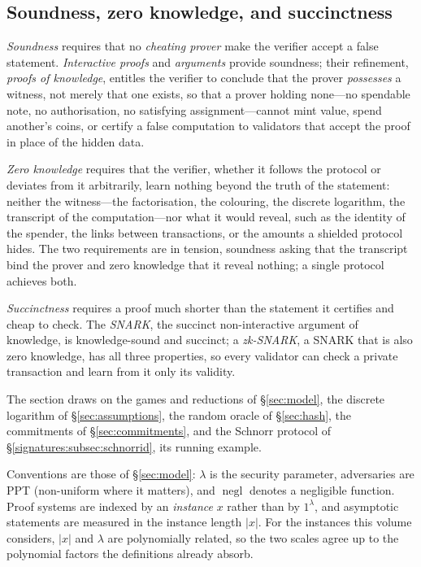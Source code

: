 \documentclass[11pt,a4paper]{article}
\theoremstyle{definition}
\theoremstyle{remark}
\DeclareMathOperator{\negl}{negl}
\providecommand{\abs}[1]{\lvert #1 \rvert}
\begin{document}
\subsection{Soundness, zero knowledge, and succinctness}\label{zk:subsec:questions}

\emph{Soundness} requires that no \emph{cheating prover} make the
verifier accept a false statement. \emph{Interactive proofs} and
\emph{arguments} provide soundness; their refinement, \emph{proofs of
knowledge}, entitles the verifier to conclude that the prover
\emph{possesses} a witness, not merely that one exists, so that a prover
holding none---no spendable note, no authorisation, no satisfying
assignment---cannot mint value, spend another's coins, or certify a
false computation to validators that accept the proof in place of the
hidden data.

\emph{Zero knowledge} requires that the verifier, whether it follows the
protocol or deviates from it arbitrarily, learn nothing beyond the truth
of the statement: neither the witness---the factorisation, the
colouring, the discrete logarithm, the transcript of the
computation---nor what it would reveal, such as the identity of the
spender, the links between transactions, or the amounts a shielded
protocol hides. The two requirements are in tension, soundness asking
that the transcript bind the prover and zero knowledge that it reveal
nothing; a single protocol achieves both.

\emph{Succinctness} requires a proof much shorter than the statement it
certifies and cheap to check. The \emph{SNARK}, the succinct
non-interactive argument of knowledge, is knowledge-sound and succinct;
a \emph{zk-SNARK}, a SNARK that is also zero knowledge, has all three
properties, so every validator can check a private transaction and
learn from it only its validity.

The section draws on the games and reductions of \S\ref{sec:model}, the
discrete logarithm of \S\ref{sec:assumptions}, the random oracle of
\S\ref{sec:hash}, the commitments of \S\ref{sec:commitments}, and the
Schnorr protocol of \S\ref{signatures:subsec:schnorrid}, its running
example.

Conventions are those of \S\ref{sec:model}: \(\lambda\) is the security
parameter, adversaries are PPT (non-uniform where it matters), and
\(\negl\) denotes a negligible function. Proof systems are indexed by an
\emph{instance} \(x\) rather than by \(1^{\lambda}\), and asymptotic
statements are measured in the instance length \(\abs{x}\). For the
instances this volume considers, \(\abs{x}\) and \(\lambda\) are
polynomially related, so the two scales agree up to the polynomial
factors the definitions already absorb.
\end{document}
